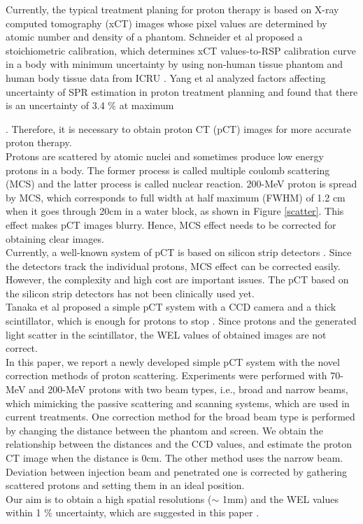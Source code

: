 \documentclass[preprint,3pt]{elsarticle} %
\begin{document}
Currently, the typical treatment planing for proton therapy is based on X-ray computed tomography (xCT) images whose pixel values are determined by atomic number and density of a phantom. Schneider et al proposed a stoichiometric calibration, which determines xCT values-to-RSP calibration curve in a body with minimum uncertainty by using non-human tissue phantom and human body tissue data from ICRU {\cite{schneider}}. Yang et al analyzed factors affecting uncertainty of SPR estimation in proton treatment planning and found that there is an uncertainty of 3.4 $\%$ at maximum {\cite{Yang}. Therefore, it is necessary to obtain proton CT (pCT) images for more accurate proton therapy.\\
	Protons are scattered by atomic nuclei and sometimes produce low energy protons in a body. The former process is called multiple coulomb scattering (MCS) and the latter process is called nuclear reaction. 200-MeV proton is spread by MCS, which corresponds to full width at half maximum (FWHM) of 1.2 cm when it goes through 20cm in a water block, as shown in Figure \ref{scatter}. This effect makes pCT images blurry. Hence, MCS effect needs to be corrected for obtaining clear images.\\
	Currently, a well-known system of pCT is based on silicon strip detectors {\cite{SSD}}. Since the detectors track the individual protons, MCS effect can be corrected easily. However, the complexity and high cost are important issues. The pCT based on the silicon strip detectors has not been clinically used yet.\\
	Tanaka et al proposed a simple pCT system with a CCD camera and a thick scintillator, which is enough for protons to stop {\cite{mrtanaka}}. Since protons and the generated light scatter in the scintillator, the WEL values of obtained images are not correct.\\
	In this paper, we report a newly developed simple pCT system with the novel correction methods of proton scattering. Experiments were performed with 70-MeV and 200-MeV protons with two beam types, i.e., broad and narrow beams, which mimicking the passive scattering and scanning systems, which are used in current treatments. One correction method for the broad beam type is performed by changing the distance between the phantom and screen. We obtain the relationship between the distances and the CCD values, and estimate the proton CT image when the distance is 0cm. The other method uses the narrow beam. Deviation between injection beam and penetrated one is corrected by gathering scattered protons and setting them in an ideal position.\\
Our aim is to obtain a high spatial resolutions ($\sim$ 1mm) and the WEL values within 1 $\%$ uncertainty, which are suggested in this paper {\cite{POLUDNIOWSKI}}.

}
\end{document}
